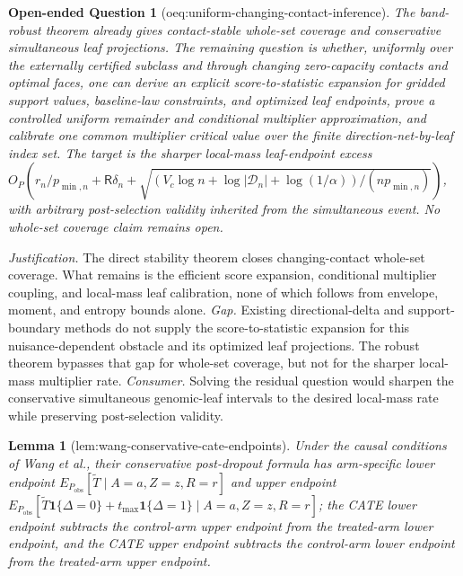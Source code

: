\documentclass{article}
\newtheorem{lemma}{Lemma}
\newtheorem{openendedquestion}{Open-ended Question}
\begin{document}
\begin{openendedquestion}[oeq:uniform-changing-contact-inference]\label{oeq:uniform-changing-contact-inference}
The band-robust theorem already gives contact-stable whole-set coverage and conservative simultaneous leaf projections. The remaining question is whether, uniformly over the externally certified subclass and through changing zero-capacity contacts and optimal faces, one can derive an explicit score-to-statistic expansion for gridded support values, baseline-law constraints, and optimized leaf endpoints, prove a controlled uniform remainder and conditional multiplier approximation, and calibrate one common multiplier critical value over the finite direction-net-by-leaf index set. The target is the sharper local-mass leaf-endpoint excess \(O_P(r_n/p_{\min,n}+\mathsf R\delta_n+\sqrt{(V_c\log n+\log|\mathcal D_n|+\log(1/\alpha))/(np_{\min,n})})\), with arbitrary post-selection validity inherited from the simultaneous event. No whole-set coverage claim remains open.
\end{openendedquestion}
\par\smallskip\noindent \textit{Justification.} The direct stability theorem closes changing-contact whole-set coverage. What remains is the efficient score expansion, conditional multiplier coupling, and local-mass leaf calibration, none of which follows from envelope, moment, and entropy bounds alone. \textit{Gap.} Existing directional-delta and support-boundary methods do not supply the score-to-statistic expansion for this nuisance-dependent obstacle and its optimized leaf projections. The robust theorem bypasses that gap for whole-set coverage, but not for the sharper local-mass multiplier rate. \textit{Consumer.} Solving the residual question would sharpen the conservative simultaneous genomic-leaf intervals to the desired local-mass rate while preserving post-selection validity.

\begin{lemma}[lem:wang-conservative-cate-endpoints]\label{lem:wang-conservative-cate-endpoints}
Under the causal conditions of Wang et al., their conservative post-dropout formula has arm-specific lower endpoint \(E_{P_{\mathrm{obs}}}[\widetilde T\mid A=a,Z=z,R=r]\) and upper endpoint \(E_{P_{\mathrm{obs}}}[\widetilde T\mathbf 1\{\Delta=0\}+t_{\max}\mathbf 1\{\Delta=1\}\mid A=a,Z=z,R=r]\); the CATE lower endpoint subtracts the control-arm upper endpoint from the treated-arm lower endpoint, and the CATE upper endpoint subtracts the control-arm lower endpoint from the treated-arm upper endpoint.
\end{lemma}
\end{document}
